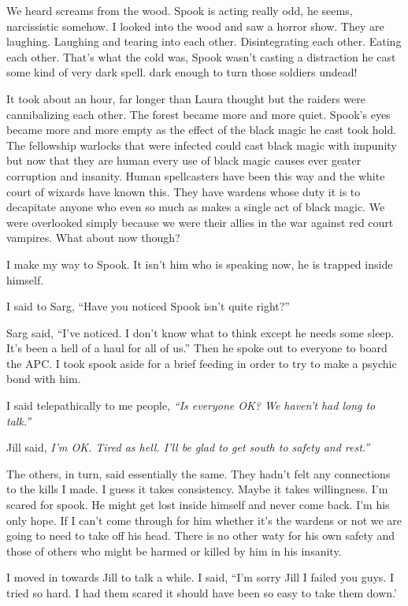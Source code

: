 We heard screams from the wood. Spook is acting really odd, he seems, narcissistic somehow. I looked into the wood and saw a horror show. They are laughing. Laughing and tearing into each other. Disintegrating each other. Eating each other. That's what the cold was, Spook wasn't casting a distraction he cast some kind of very dark spell. dark enough to turn those soldiers undead!

It took about an hour, far longer than Laura thought but the raiders were cannibalizing each other. The forest became more and more quiet. Spook's eyes became more and more empty as the effect of the black magic he cast took hold. The fellowship warlocks that were infected could cast black magic with impunity but now that they are human every use of black magic causes ever geater corruption and insanity. Human spellcasters have been this way and the white court of wixards have known this. They have wardens whose duty it is to decapitate anyone who even so much as makes a single act of black magic. We  were overlooked simply because we were their allies in the war against red court vampires.  What about now though?

I make my way to Spook. It isn't him who is speaking now, he is trapped inside himself.

I said to Sarg, ``Have you noticed Spook isn't quite right?''

Sarg said, ``I've noticed. I don't know what to think except he needs some sleep. It's been a hell of a haul for all of us.'' Then he spoke out to everyone to board the APC. I took spook aside for a brief feeding in order to try to make a psychic bond with him.

I said telepathically to me people, \textit{``Is everyone OK? We haven't had long to talk.''}

Jill said, \textit{I'm OK. Tired as hell. I'll be glad to get south to safety and rest.''}

The others, in turn, said essentially the same. They hadn't felt any connections to the kills I made. I guess it takes consistency. Maybe it takes willingness. I'm scared for spook. He might get lost inside himself and never come back. I'm his only hope. If I can't come through for him whether it's the wardens or not we are going to need to take off his head. There is no other waty for his own safety and those of others who might be harmed or killed by him in his insanity.

I moved in towards Jill to talk a while. I said, ``I'm sorry Jill I failed you guys. I tried so hard. I had them scared it should have been so easy to take them down.'

